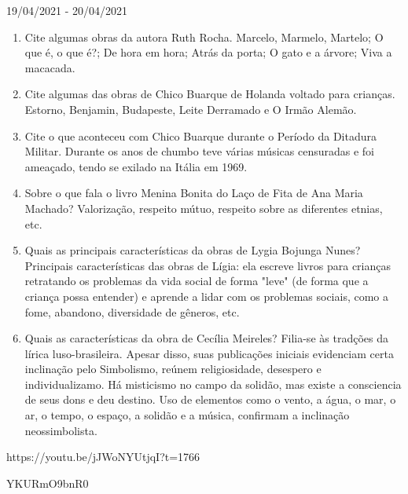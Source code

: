 \documentclass{SchoolBook}
\begin{document}
\begin{day}{19/04/2021 - 20/04/2021}
\begin{enumerate}
            \item Cite algumas obras da autora Ruth Rocha.
            \response Marcelo, Marmelo, Martelo; O que é, o que é?; De hora em hora; Atrás da porta; O gato e a árvore; Viva a macacada.

            \item Cite algumas das obras de Chico Buarque de Holanda voltado para crianças.
            \response Estorno, Benjamin, Budapeste, Leite Derramado e O Irmão Alemão.

            \item Cite o que aconteceu com Chico Buarque durante o Período da Ditadura Militar.
            \response Durante os anos de chumbo teve várias músicas censuradas e foi ameaçado, tendo se exilado na Itália em 1969.

            \item Sobre o que fala o livro Menina Bonita do Laço de Fita de Ana Maria Machado?
            \response Valorização, respeito mútuo, respeito sobre as diferentes etnias, etc.

            \item Quais as principais características da obras de Lygia Bojunga Nunes?
            \response Principais características das obras de Lígia: ela escreve livros para crianças retratando os problemas da vida social de forma "leve" (de forma que a criança possa entender) e aprende a lidar com os problemas sociais, como a fome, abandono, diversidade de gêneros, etc.

            \item Quais as características da obra de Cecília Meireles?
            \response Filia-se às tradções da lírica luso-brasileira. Apesar disso, suas publicações iniciais evidenciam certa inclinação pelo Simbolismo, reúnem religiosidade, desespero e individualizamo. Há misticismo no campo da solidão, mas existe a consciencia de seus dons e deu destino. Uso de elementos como o vento, a água, o mar, o ar, o tempo, o espaço, a solidão e a música, confirmam a inclinação neossimbolista.
        \end{enumerate}
    \end{day}
  
    https://youtu.be/jJWoNYUtjqI?t=1766
    
    YKURmO9bnR0
\end{document}
